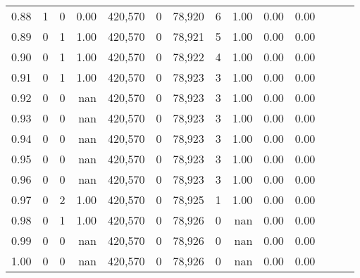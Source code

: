 \begin{tabular}{rrrrrrrrrrrrrr}
0.88 &       1 &      0 &  0.00 &  420,570 &        0 &  78,920 &       6 &  1.00 &  0.00 &      0.00 \\
0.89 &       0 &      1 &  1.00 &  420,570 &        0 &  78,921 &       5 &  1.00 &  0.00 &      0.00 \\
0.90 &       0 &      1 &  1.00 &  420,570 &        0 &  78,922 &       4 &  1.00 &  0.00 &      0.00 \\
0.91 &       0 &      1 &  1.00 &  420,570 &        0 &  78,923 &       3 &  1.00 &  0.00 &      0.00 \\
0.92 &       0 &      0 &   nan &  420,570 &        0 &  78,923 &       3 &  1.00 &  0.00 &      0.00 \\
0.93 &       0 &      0 &   nan &  420,570 &        0 &  78,923 &       3 &  1.00 &  0.00 &      0.00 \\
0.94 &       0 &      0 &   nan &  420,570 &        0 &  78,923 &       3 &  1.00 &  0.00 &      0.00 \\
0.95 &       0 &      0 &   nan &  420,570 &        0 &  78,923 &       3 &  1.00 &  0.00 &      0.00 \\
0.96 &       0 &      0 &   nan &  420,570 &        0 &  78,923 &       3 &  1.00 &  0.00 &      0.00 \\
0.97 &       0 &      2 &  1.00 &  420,570 &        0 &  78,925 &       1 &  1.00 &  0.00 &      0.00 \\
0.98 &       0 &      1 &  1.00 &  420,570 &        0 &  78,926 &       0 &   nan &  0.00 &      0.00 \\
0.99 &       0 &      0 &   nan &  420,570 &        0 &  78,926 &       0 &   nan &  0.00 &      0.00 \\
1.00 &       0 &      0 &   nan &  420,570 &        0 &  78,926 &       0 &   nan &  0.00 &      0.00 \\
\bottomrule
\end{tabular}
